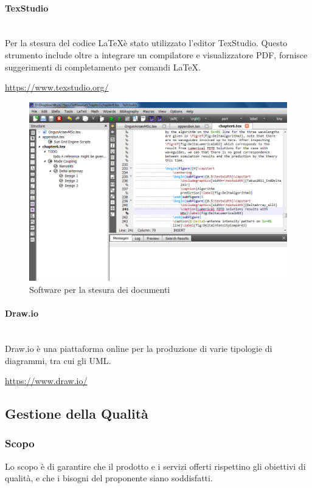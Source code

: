 		\paragraph{TexStudio} \mbox{}\\
		Per la stesura del codice \LaTeX è stato utilizzato l'editor TexStudio. Questo strumento include oltre a integrare un compilatore e visualizzatore PDF, fornisce suggerimenti di completamento per comandi \LaTeX{}. \newline
		\centerline{\url{https://www.texstudio.org/}}
		\begin{figure}[H]
			\includegraphics[width=0.99\linewidth]{res/images/latex.jpg}
			\caption{Software per la stesura dei documenti}
		\end{figure} 
		\paragraph{Draw.io} \mbox{}\\
		Draw.io è una piattaforma online per la produzione di varie tipologie di diagrammi, tra cui gli UML. \newline
		\centerline{\url{https://www.draw.io/}}
	
\subsection{Gestione della Qualità}
	\subsubsection{Scopo}
	Lo scopo è di garantire che il prodotto e i servizi offerti rispettino gli obiettivi di qualità, e che i bisogni del proponente siano soddisfatti.

